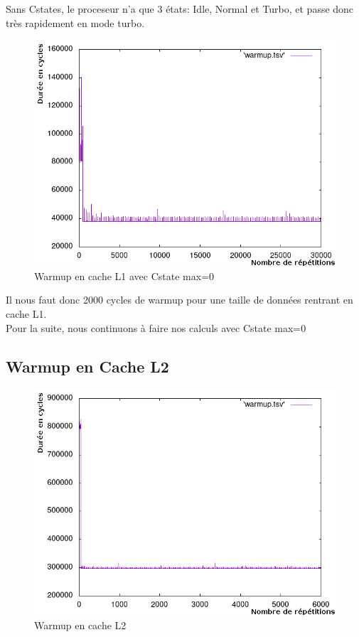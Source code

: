 \documentclass[a4paper]{report}
\begin{document}
Sans Cstates, le proceseur n'a que 3 états: Idle, Normal et Turbo, et passe donc très rapidement en mode turbo.\\
\newpage
    \begin{figure}[ht!]
        \centering
        \includegraphics[width=120mm]{MEDIA/warmupL1_NOCstate.png}
        \caption{Warmup en cache L1 avec Cstate max=0}
    \end{figure}

Il nous faut donc 2000 cycles de warmup pour une taille de données rentrant en cache L1.\\

Pour la suite, nous continuons à faire nos calculs avec Cstate max=0
\newpage

\subsection*{Warmup en Cache L2}
    \begin{figure}[ht!]
        \centering
        \includegraphics[width=120mm]{MEDIA/warmupL2_NOCstate.png}
        \caption{Warmup en cache L2}
    \end{figure}
\end{document}
